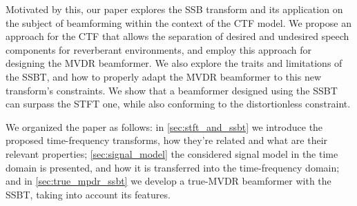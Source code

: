 Motivated by this, our paper explores the SSB transform and its application on the subject of beamforming within the context of the CTF model. We propose an approach for the CTF that allows the separation of desired and undesired speech components for reverberant environments, and employ this approach for designing the MVDR beamformer. We also explore the traits and limitations of the SSBT, and how to properly adapt the MVDR beamformer to this new transform's constraints. We show that a beamformer designed using the SSBT can surpass the STFT one, while also conforming to the distortionless constraint.

We organized the paper as follows:
in \cref{sec:stft_and_ssbt} we introduce the proposed time-frequency transforms, how they're related and what are their relevant properties;
\cref{sec:signal_model} the considered signal model in the time domain is presented, and how it is transferred into the time-frequency domain;
and in \cref{sec:true_mpdr_ssbt} we develop a true-MVDR beamformer with the SSBT, taking into account its features.
